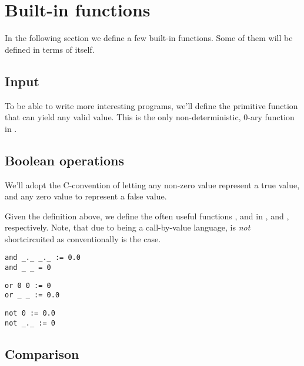 \section{Built-in functions}\label{section:language-higher-order-built-ins}

In the following section we define a few built-in \D{} functions. Some of them
will be defined in terms of \D{} itself.

\subsection{Input}

To be able to write more interesting programs, we'll define the primitive
function  that can yield any valid \D{} value. This is the only
non-deterministic, 0-ary function in \D{}.

\subsection{Boolean operations}

\begin{definition} We'll adopt the C-convention of letting any non-zero value
represent a true value, and any zero value to represent a false
value.\end{definition}

Given the definition above, we define the often useful functions ,
 and  in ,  and
, respectively. Note, that due to \D{} being a
call-by-value language,  is \emph{not} shortcircuited as
conventionally is the case.

\begin{lstlisting}[label=listing:and,
  caption={The function \mono{and/2}.}]
and _._ _._ := 0.0
and _ _ = 0
\end{lstlisting}

\begin{lstlisting}[label=listing:or,
  caption={The function \mono{or/2}.}]
or 0 0 := 0
or _ _ := 0.0
\end{lstlisting}

\begin{lstlisting}[label=listing:not,
  caption={The function \mono{not/1}.}]
not 0 := 0.0
not _._ := 0
\end{lstlisting}

\subsection{Comparison}

